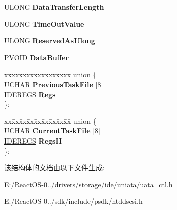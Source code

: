 \begin{DoxyCompactItemize}
\mbox{\label{struct___a_t_a___p_a_s_s___t_h_r_o_u_g_h___d_i_r_e_c_t_ae3f2fecfa63376c382c3cee6853dd722}} 
U\+L\+O\+NG {\bfseries Data\+Transfer\+Length}
\item 
\mbox{\label{struct___a_t_a___p_a_s_s___t_h_r_o_u_g_h___d_i_r_e_c_t_a33683ce7cec4eb5aa8805085f7f040fa}} 
U\+L\+O\+NG {\bfseries Time\+Out\+Value}
\item 
\mbox{\label{struct___a_t_a___p_a_s_s___t_h_r_o_u_g_h___d_i_r_e_c_t_a303798848851cd9707d4d8ec5add8a50}} 
U\+L\+O\+NG {\bfseries Reserved\+As\+Ulong}
\item 
\mbox{\label{struct___a_t_a___p_a_s_s___t_h_r_o_u_g_h___d_i_r_e_c_t_a1e686190fcc62183d56dde3857f05427}} 
\hyperlink{interfacevoid}{P\+V\+O\+ID} {\bfseries Data\+Buffer}
\item 
\mbox{\label{struct___a_t_a___p_a_s_s___t_h_r_o_u_g_h___d_i_r_e_c_t_a48204b2b1206ed2d340a3f46cd47400d}} 
\begin{tabbing}
xx\=xx\=xx\=xx\=xx\=xx\=xx\=xx\=xx\=\kill
union \{\\
\>UCHAR {\bfseries PreviousTaskFile} \mbox{[}8\mbox{]}\\
\>\hyperlink{struct___i_d_e_r_e_g_s}{IDEREGS} {\bfseries Regs}\\
\}; \\

\end{tabbing}\item 
\mbox{\label{struct___a_t_a___p_a_s_s___t_h_r_o_u_g_h___d_i_r_e_c_t_a5ffcc416ba8f393b9d0d7de290edacad}} 
\begin{tabbing}
xx\=xx\=xx\=xx\=xx\=xx\=xx\=xx\=xx\=\kill
union \{\\
\>UCHAR {\bfseries CurrentTaskFile} \mbox{[}8\mbox{]}\\
\>\hyperlink{struct___i_d_e_r_e_g_s}{IDEREGS} {\bfseries RegsH}\\
\}; \\

\end{tabbing}\end{DoxyCompactItemize}


该结构体的文档由以下文件生成\+:\begin{DoxyCompactItemize}
\item 
E\+:/\+React\+O\+S-\/0../drivers/storage/ide/uniata/uata\+\_\+ctl.\+h\item 
E\+:/\+React\+O\+S-\/0../sdk/include/psdk/ntddscsi.\+h\end{DoxyCompactItemize}
